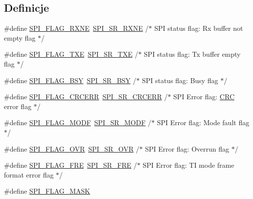 \subsection*{Definicje}
\begin{DoxyCompactItemize}
\item 
\#define \hyperlink{group___s_p_i___flags__definition_ga7bd627ae57160a2f0aad1736194b5999}{S\+P\+I\+\_\+\+F\+L\+A\+G\+\_\+\+R\+X\+NE}~\hyperlink{group___peripheral___registers___bits___definition_ga40e14de547aa06864abcd4b0422d8b48}{S\+P\+I\+\_\+\+S\+R\+\_\+\+R\+X\+NE}   /$\ast$ S\+PI status flag\+: Rx buffer not empty flag       $\ast$/
\item 
\#define \hyperlink{group___s_p_i___flags__definition_gaf84a1e6af2739a6be58e1b23d9e6b914}{S\+P\+I\+\_\+\+F\+L\+A\+G\+\_\+\+T\+XE}~\hyperlink{group___peripheral___registers___bits___definition_ga5bd5d21816947fcb25ccae7d3bf8eb2c}{S\+P\+I\+\_\+\+S\+R\+\_\+\+T\+XE}    /$\ast$ S\+PI status flag\+: Tx buffer empty flag           $\ast$/
\item 
\#define \hyperlink{group___s_p_i___flags__definition_gaf19c77ee876a3598d616ac07d136fc46}{S\+P\+I\+\_\+\+F\+L\+A\+G\+\_\+\+B\+SY}~\hyperlink{group___peripheral___registers___bits___definition_gaa3498df67729ae048dc5f315ef7c16bf}{S\+P\+I\+\_\+\+S\+R\+\_\+\+B\+SY}    /$\ast$ S\+PI status flag\+: Busy flag                      $\ast$/
\item 
\#define \hyperlink{group___s_p_i___flags__definition_ga30fb6af50e1f3c61cb9de76b0101c889}{S\+P\+I\+\_\+\+F\+L\+A\+G\+\_\+\+C\+R\+C\+E\+RR}~\hyperlink{group___peripheral___registers___bits___definition_ga69e543fa9584fd636032a3ee735f750b}{S\+P\+I\+\_\+\+S\+R\+\_\+\+C\+R\+C\+E\+RR} /$\ast$ S\+PI Error flag\+: \hyperlink{group___peripheral__declaration_ga4381bb54c2dbc34500521165aa7b89b1}{C\+RC} error flag                  $\ast$/
\item 
\#define \hyperlink{group___s_p_i___flags__definition_gac7d3525ab98cc18f02270a4dba685897}{S\+P\+I\+\_\+\+F\+L\+A\+G\+\_\+\+M\+O\+DF}~\hyperlink{group___peripheral___registers___bits___definition_gabaa043349833dc7b8138969c64f63adf}{S\+P\+I\+\_\+\+S\+R\+\_\+\+M\+O\+DF}   /$\ast$ S\+PI Error flag\+: Mode fault flag                 $\ast$/
\item 
\#define \hyperlink{group___s_p_i___flags__definition_gab45264da2296c75495a7437a045513ea}{S\+P\+I\+\_\+\+F\+L\+A\+G\+\_\+\+O\+VR}~\hyperlink{group___peripheral___registers___bits___definition_gaa8d902302c5eb81ce4a57029de281232}{S\+P\+I\+\_\+\+S\+R\+\_\+\+O\+VR}    /$\ast$ S\+PI Error flag\+: Overrun flag                    $\ast$/
\item 
\#define \hyperlink{group___s_p_i___flags__definition_ga27dd114d8adc70f1439c054289f9313a}{S\+P\+I\+\_\+\+F\+L\+A\+G\+\_\+\+F\+RE}~\hyperlink{group___peripheral___registers___bits___definition_gace2c7cac9431231663af42e6f5aabce6}{S\+P\+I\+\_\+\+S\+R\+\_\+\+F\+RE}    /$\ast$ S\+PI Error flag\+: TI mode frame format error flag $\ast$/
\item 
\#define \hyperlink{group___s_p_i___flags__definition_ga1b2ed6861d967c5bc45a7e7c9101d33c}{S\+P\+I\+\_\+\+F\+L\+A\+G\+\_\+\+M\+A\+SK}
\end{DoxyCompactItemize}


